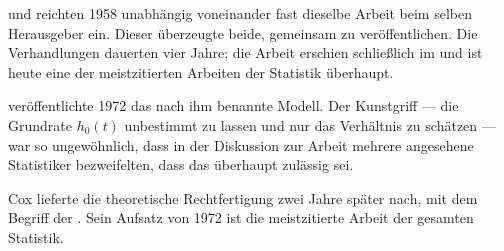 \begin{geschichte}
 und  reichten 1958 unabhängig voneinander fast dieselbe Arbeit beim selben Herausgeber ein. Dieser überzeugte beide, gemeinsam zu veröffentlichen. Die Verhandlungen dauerten vier Jahre; die Arbeit erschien schließlich im  und ist heute eine der meistzitierten Arbeiten der Statistik überhaupt.

\begin{center}
\begin{minipage}{0.9\textwidth}
\end{minipage}
\end{center}

 veröffentlichte 1972 das nach ihm benannte Modell. Der Kunstgriff --- die Grundrate $h_0(t)$ unbestimmt zu lassen und nur das Verhältnis zu schätzen --- war so ungewöhnlich, dass in der Diskussion zur Arbeit mehrere angesehene Statistiker bezweifelten, dass das überhaupt zulässig sei.

Cox lieferte die theoretische Rechtfertigung zwei Jahre später nach, mit dem Begriff der . Sein Aufsatz von 1972 ist die meistzitierte Arbeit der gesamten Statistik.
\end{geschichte}

